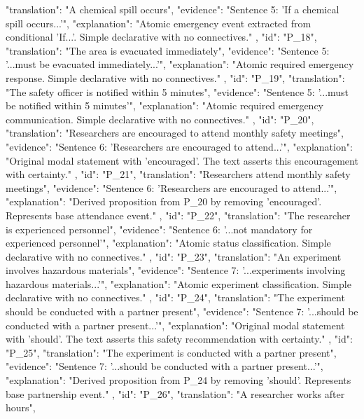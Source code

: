 {{      "translation": "A chemical spill occurs",
      "evidence": "Sentence 5: 'If a chemical spill occurs...'",
      "explanation": "Atomic emergency event extracted from conditional 'If...'. Simple declarative with no connectives."
    },
    {
      "id": "P_18",
      "translation": "The area is evacuated immediately",
      "evidence": "Sentence 5: '...must be evacuated immediately...'",
      "explanation": "Atomic required emergency response. Simple declarative with no connectives."
    },
    {
      "id": "P_19",
      "translation": "The safety officer is notified within 5 minutes",
      "evidence": "Sentence 5: '...must be notified within 5 minutes'",
      "explanation": "Atomic required emergency communication. Simple declarative with no connectives."
    },
    {
      "id": "P_20",
      "translation": "Researchers are encouraged to attend monthly safety meetings",
      "evidence": "Sentence 6: 'Researchers are encouraged to attend...'",
      "explanation": "Original modal statement with 'encouraged'. The text asserts this encouragement with certainty."
    },
    {
      "id": "P_21",
      "translation": "Researchers attend monthly safety meetings",
      "evidence": "Sentence 6: 'Researchers are encouraged to attend...'",
      "explanation": "Derived proposition from P_20 by removing 'encouraged'. Represents base attendance event."
    },
    {
      "id": "P_22",
      "translation": "The researcher is experienced personnel",
      "evidence": "Sentence 6: '...not mandatory for experienced personnel'",
      "explanation": "Atomic status classification. Simple declarative with no connectives."
    },
    {
      "id": "P_23",
      "translation": "An experiment involves hazardous materials",
      "evidence": "Sentence 7: '...experiments involving hazardous materials...'",
      "explanation": "Atomic experiment classification. Simple declarative with no connectives."
    },
    {
      "id": "P_24",
      "translation": "The experiment should be conducted with a partner present",
      "evidence": "Sentence 7: '...should be conducted with a partner present...'",
      "explanation": "Original modal statement with 'should'. The text asserts this safety recommendation with certainty."
    },
    {
      "id": "P_25",
      "translation": "The experiment is conducted with a partner present",
      "evidence": "Sentence 7: '...should be conducted with a partner present...'",
      "explanation": "Derived proposition from P_24 by removing 'should'. Represents base partnership event."
    },
    {
      "id": "P_26",
      "translation": "A researcher works after hours",
}}
